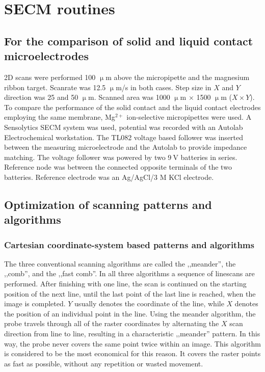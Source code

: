 	\section{SECM routines}
		\subsection{For the comparison of solid and liquid contact microelectrodes}
2D scans were performed 100 $\upmu$m above the micropipette and the magnesium ribbon target.
Scanrate was 12.5 $\upmu$m/s in both cases.
Step size in $X$ and $Y$ direction was 25 and 50 $\upmu$m.
Scanned area was 1000 $\upmu$m $\times$ 1500 $\upmu$m ($X\times Y$).
To compare the performance of the solid contact and the liquid contact electrodes employing the same membrane, Mg$^{2+}$ ion-selective micropipettes were used.
A Sensolytics SECM system was used, potential was recorded with an Autolab Electrochemical workstation.
The TL082 voltage based follower was inserted between the measuring microelectrode and the Autolab to provide impedance matching. The voltage follower was powered by two 9$~$V batteries in series. Reference node was between the connected opposite terminals of the two batteries.
Reference electrode was an Ag/AgCl/3 M KCl electrode.
		\subsection{Optimization of scanning patterns and algorithms}
			\subsubsection{Cartesian coordinate-system based patterns and algorithms}
The three conventional scanning algorithms are called the ,,meander'', the ,,comb'', and the ,,fast comb''.
In all three algorithms a sequence of linescans are performed.
After finishing with one line, the scan is continued on the starting position of the next line, until the last point of the last line is reached, when the image is completed.
$Y$ usually denotes the coordinate of the line, while $X$ denotes the position of an individual point in the line.
Using the meander algorithm, the probe travels through all of the raster coordinates by alternating the $X$ scan direction from line to line, resulting in a characteristic ,,meander'' pattern.
In this way, the probe never covers the same point twice within an image.
This algorithm is considered to be the most economical for this reason.
It covers the raster points as fast as possible, without any repetition or wasted movement.

